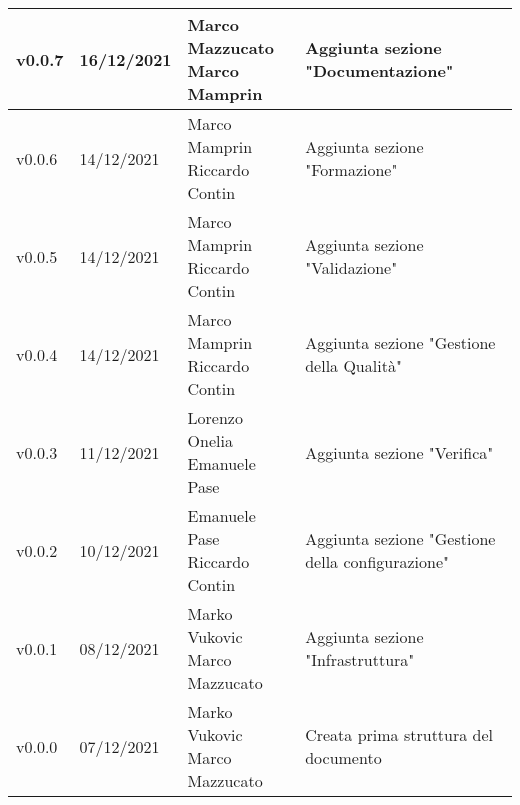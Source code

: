 \begin{center}
\begin{tabular}{|p{2cm}|p{2cm}|p{4cm}|p{5cm}|}
    v0.0.7            & 16/12/2021    & \aCapo{Marco Mazzucato\\Marco Mamprin} & Aggiunta sezione "Documentazione" \\ \hline
    v0.0.6            & 14/12/2021    & \aCapo{Marco Mamprin\\Riccardo Contin} & Aggiunta sezione "Formazione" \\ \hline
    v0.0.5            & 14/12/2021    & \aCapo{Marco Mamprin\\Riccardo Contin}   & Aggiunta sezione "Validazione" \\ \hline
    v0.0.4            & 14/12/2021    & \aCapo{Marco Mamprin\\Riccardo Contin}   & Aggiunta sezione "Gestione della Qualità" \\ \hline
    v0.0.3            & 11/12/2021    & \aCapo{Lorenzo Onelia\\Emanuele Pase} & Aggiunta sezione "Verifica" \\ \hline
    v0.0.2            & 10/12/2021    & \aCapo{Emanuele Pase\\Riccardo Contin}  & Aggiunta sezione "Gestione della configurazione" \\ \hline
    v0.0.1            & 08/12/2021    & \aCapo{Marko Vukovic\\Marco Mazzucato}   & Aggiunta sezione "Infrastruttura" \\ \hline
    v0.0.0            & 07/12/2021    & \aCapo{Marko Vukovic\\Marco Mazzucato}   & Creata prima struttura del documento \\ \hline
  \end{tabular}
\end{center}
